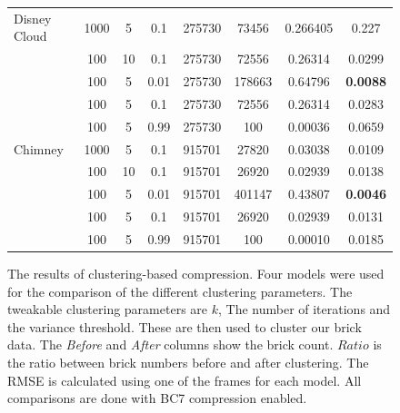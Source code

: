 \begin{figure}[H]
{\begin{tabular}{|l|ccc|cccc|}
            \hline
            \midrule
            Disney Cloud & 1000 & 5          & 0.1                & 275730  & 73456   & 0.266405          & 0.227           \\
                         & 100  & 10         & 0.1                & 275730  & 72556   & 0.26314           & 0.0299          \\
                         & 100  & 5          & 0.01               & 275730  & 178663  & 0.64796           & \textbf{0.0088} \\
                         & 100  & 5          & 0.1                & 275730  & 72556   & 0.26314           & 0.0283          \\
                         & 100  & 5          & 0.99               & 275730  & 100     & 0.00036           & 0.0659          \\
            \hline
            \midrule
            Chimney      & 1000 & 5          & 0.1                & 915701  & 27820   & 0.03038           & 0.0109          \\
                         & 100  & 10         & 0.1                & 915701  & 26920   & 0.02939           & 0.0138          \\
                         & 100  & 5          & 0.01               & 915701  & 401147  & 0.43807           & \textbf{0.0046} \\
                         & 100  & 5          & 0.1                & 915701  & 26920   & 0.02939           & 0.0131          \\
                         & 100  & 5          & 0.99               & 915701  & 100     & 0.00010           & 0.0185          \\
            \hline
            \bottomrule
        \end{tabular}
        \label{tab:block_compression_visualized:table}
    }

    \caption{The results of clustering-based compression. Four models were used for the comparison of the different clustering parameters. The tweakable clustering parameters are $k$, The number of iterations and the variance threshold. These are then used to cluster our brick data. The \textit{Before} and \textit{After} columns show the brick count. $Ratio$ is the ratio between brick numbers before and after clustering. The RMSE is calculated using one of the frames for each model. All comparisons are done with BC7 compression enabled.} \label{fig:block_compression_visualized}
\end{figure}

